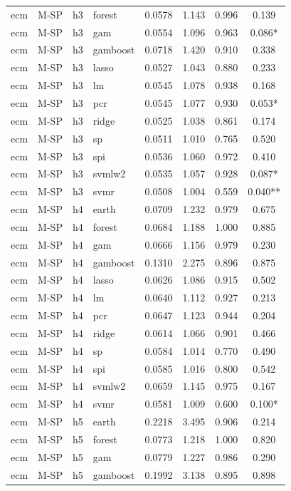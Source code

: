 \begin{ThreePartTable}
\begin{longtable}[t]{llclcccc}
ecm & M-SP & h3 & forest & 0.0578 & 1.143 & 0.996 & 0.139\\
ecm & M-SP & h3 & gam & 0.0554 & 1.096 & 0.963 & 0.086*\\
ecm & M-SP & h3 & gamboost & 0.0718 & 1.420 & 0.910 & 0.338\\
ecm & M-SP & h3 & lasso & 0.0527 & 1.043 & 0.880 & 0.233\\
ecm & M-SP & h3 & lm & 0.0545 & 1.078 & 0.938 & 0.168\\
ecm & M-SP & h3 & pcr & 0.0545 & 1.077 & 0.930 & 0.053*\\
ecm & M-SP & h3 & ridge & 0.0525 & 1.038 & 0.861 & 0.174\\
ecm & M-SP & h3 & sp & 0.0511 & 1.010 & 0.765 & 0.520\\
ecm & M-SP & h3 & spi & 0.0536 & 1.060 & 0.972 & 0.410\\
ecm & M-SP & h3 & svmlw2 & 0.0535 & 1.057 & 0.928 & 0.087*\\
ecm & M-SP & h3 & svmr & 0.0508 & 1.004 & 0.559 & 0.040**\\
\addlinespace
ecm & M-SP & h4 & earth & 0.0709 & 1.232 & 0.979 & 0.675\\
ecm & M-SP & h4 & forest & 0.0684 & 1.188 & 1.000 & 0.885\\
ecm & M-SP & h4 & gam & 0.0666 & 1.156 & 0.979 & 0.230\\
ecm & M-SP & h4 & gamboost & 0.1310 & 2.275 & 0.896 & 0.875\\
ecm & M-SP & h4 & lasso & 0.0626 & 1.086 & 0.915 & 0.502\\
ecm & M-SP & h4 & lm & 0.0640 & 1.112 & 0.927 & 0.213\\
ecm & M-SP & h4 & pcr & 0.0647 & 1.123 & 0.944 & 0.204\\
ecm & M-SP & h4 & ridge & 0.0614 & 1.066 & 0.901 & 0.466\\
ecm & M-SP & h4 & sp & 0.0584 & 1.014 & 0.770 & 0.490\\
ecm & M-SP & h4 & spi & 0.0585 & 1.016 & 0.800 & 0.542\\
ecm & M-SP & h4 & svmlw2 & 0.0659 & 1.145 & 0.975 & 0.167\\
ecm & M-SP & h4 & svmr & 0.0581 & 1.009 & 0.600 & 0.100*\\
\addlinespace
ecm & M-SP & h5 & earth & 0.2218 & 3.495 & 0.906 & 0.214\\
ecm & M-SP & h5 & forest & 0.0773 & 1.218 & 1.000 & 0.820\\
ecm & M-SP & h5 & gam & 0.0779 & 1.227 & 0.986 & 0.290\\
ecm & M-SP & h5 & gamboost & 0.1992 & 3.138 & 0.895 & 0.898\\

\end{longtable}
\end{ThreePartTable}
